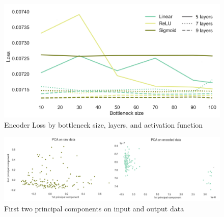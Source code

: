 \documentclass{article}
\begin{document}
\begin{figure}[h]
\includegraphics[width=12cm]{NN_lay_act_bsize_loss.png}
\centering
\caption{Encoder Loss by bottleneck size, layers, and activation function}
\end{figure}

\begin{figure}[h]
\includegraphics[width=15cm]{PCA_both.png}
\centering
\caption{First two principal components on input and output data}
\end{figure}
\end{document}
